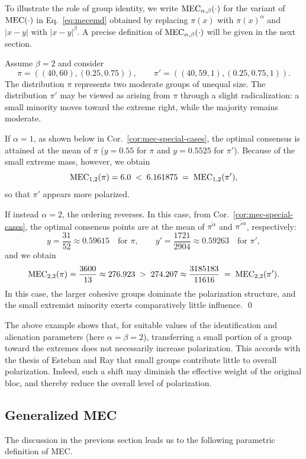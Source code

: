 To illustrate the role of group identity, we write \(\MEC(\cdot)\) for the variant of \(\MECEMD(\cdot)\) in Eq.~\ref{eq:mecemd} obtained by replacing \(\pi(x)\) with \(\pi(x)^\alpha\) and \(|x-y|\) with \(|x-y|^\beta\). A precise definition of \(\MEC(\cdot)\) will be given in the next section.

\begin{example}\label{ex:group-identity}
Assume $\beta=2$ and consider
\[
\pi=((40,60),(0.25,0.75)),
\qquad
\pi'=((40,59,1),(0.25,0.75,1)).
\]
The distribution $\pi$ represents two moderate groups of unequal size. 
The distribution $\pi'$ may be viewed as arising from $\pi$ through a slight radicalization: a small minority moves toward the extreme right, while the majority remains moderate.

If $\alpha=1$, as shown below in Cor.~\ref{cor:mec-special-cases}, the optimal consensus is attained at the mean of $\pi$
($y=0.55$ for $\pi$ and $y=0.5525$ for $\pi'$). 
Because of the small extreme mass, however, we obtain
\[
\MEC[1,2](\pi)=6.0 \;<\; 6.161875 \;=\; \MEC[1,2](\pi'),
\]
so that $\pi'$ appears more polarized.

If instead $\alpha=2$, the ordering reverses. 
In this case, from Cor.~\ref{cor:mec-special-cases}, the optimal consensus points are at the mean of $\overline{\pi^\alpha}$ and $\overline{\pi'^\alpha}$, respectively:
\[
y=\frac{31}{52}\approx 0.59615 \quad \text{for }\pi,
\qquad
y'=\frac{1721}{2904}\approx 0.59263 \quad \text{for }\pi',
\]
and we obtain
\[
\MEC[2,2](\pi)=\frac{3600}{13}\approx 276.923 \;>\; 274.207 \approx \frac{3185183}{11616} \;=\; \MEC[2,2](\pi').
\]
In this case, the larger cohesive groups dominate the polarization structure, and the small extremist minority exerts comparatively little influence.
\qed
\end{example}

The above example shows that, for suitable values of the identification
and alienation parameters (here $\alpha=\beta=2$), transferring a small
portion of a group toward the extremes does not necessarily increase
polarization. This accords with the thesis of Esteban and Ray
\cite{esteban1994measurement} that small groups contribute little to
overall polarization. Indeed, such a shift may diminish the effective
weight of the original bloc, and thereby reduce the overall level of
polarization.

\subsection{Generalized MEC}
The discussion in the previous section leads us to the following parametric definition of MEC.

